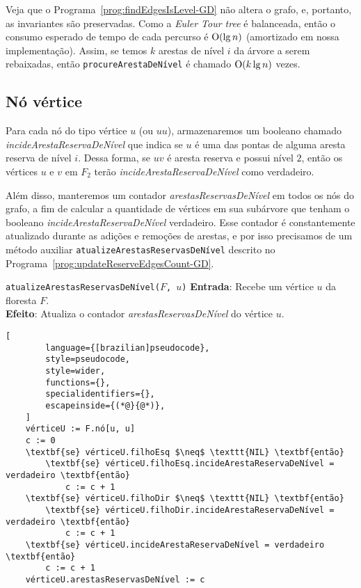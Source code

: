 Veja que o Programa~\ref{prog:findEdgesIsLevel-GD} não altera o grafo, e, portanto, as invariantes são preservadas. Como a \textit{Euler Tour tree} é balanceada, então o consumo esperado de tempo de cada percurso é $\mathrm{O}(\lg n)$ (amortizado em nossa implementação). Assim, se temos $k$ arestas de nível $i$ da árvore a serem rebaixadas, então \texttt{procureArestaDeNível} é chamado  $\mathrm{O}(k \lg n)$ vezes.

\subsection{Nó vértice}
\label{sec:node-vertex}

Para cada nó do tipo vértice $u$ (ou $uu$), armazenaremos um booleano chamado \textit{incideArestaReservaDeNível} que indica se $u$ é uma das pontas de alguma aresta reserva de nível $i$. Dessa forma, se $uv$ é aresta reserva e possui nível $2$, então os vértices $u$ e $v$ em $F_2$ terão \textit{incideArestaReservaDeNível} como verdadeiro. 

Além disso, manteremos um contador \textit{arestasReservasDeNível} em todos os nós do grafo, a fim de calcular a quantidade de vértices em sua subárvore que tenham o booleano \textit{incideArestaReservaDeNível} verdadeiro. Esse contador é constantemente atualizado durante as adições e remoções de arestas, e por isso precisamos de um método auxiliar \texttt{atualizeArestasReservasDeNível} descrito no Programa~\ref{prog:updateReserveEdgesCount-GD}.

\begin{programruledcaption}{\texttt{atualizeArestasReservasDeNível($F$, $u$)} \label{prog:updateReserveEdgesCount-GD}}
    \noindent\textbf{Entrada}: Recebe um vértice $u$ da floresta $F$.
    \\
    \noindent\textbf{Efeito}: Atualiza o contador \textit{arestasReservasDeNível} do vértice $u$.
    \vspace{-0.5\baselineskip}
    \begin{lstlisting}[
        language={[brazilian]pseudocode},
        style=pseudocode,
        style=wider,
        functions={},
        specialidentifiers={},
        escapeinside={(*@}{@*)},
    ]
    vérticeU := F.nó[u, u]
    c := 0
    \textbf{se} vérticeU.filhoEsq $\neq$ \texttt{NIL} \textbf{então}
        \textbf{se} vérticeU.filhoEsq.incideArestaReservaDeNível = verdadeiro \textbf{então}
            c := c + 1
    \textbf{se} vérticeU.filhoDir $\neq$ \texttt{NIL} \textbf{então}
        \textbf{se} vérticeU.filhoDir.incideArestaReservaDeNível = verdadeiro \textbf{então}
            c := c + 1
    \textbf{se} vérticeU.incideArestaReservaDeNível = verdadeiro \textbf{então}
        c := c + 1
    vérticeU.arestasReservasDeNível := c
    \end{lstlisting}
    \vspace{-0.5\baselineskip}
\end{programruledcaption}

